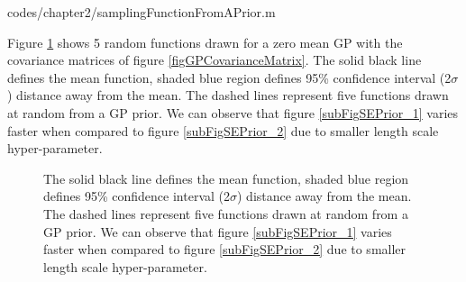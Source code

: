 \begin{mdframed}[hidealllines=true,backgroundcolor=lightgray!20]

                    {codes/chapter2/samplingFunctionFromAPrior.m}
\end{mdframed}

Figure \ref{figGPPriors} shows 5 random functions drawn for a zero mean GP with the covariance matrices of figure \ref{figGPCovarianceMatrix}. The solid black line defines the mean function, shaded blue region defines 95\% confidence interval (2$\sigma$) distance away from the mean. The dashed lines represent five functions drawn at random from a GP prior. We can observe that figure \ref{subFigSEPrior_1} varies faster when compared to figure \ref{subFigSEPrior_2} due to smaller length scale hyper-parameter. 

\begin{figure}[!ht]
  \centering
    \quad
{}\quad
  
       \caption{The solid black line defines the mean function, shaded blue region defines 95\% confidence interval (2$\sigma$) distance away from the mean. The dashed lines represent five functions drawn at random from a GP prior. We can observe that figure \ref{subFigSEPrior_1} varies faster when compared to figure \ref{subFigSEPrior_2} due to smaller length scale hyper-parameter.       }\label{figGPPriors}
\end{figure}



